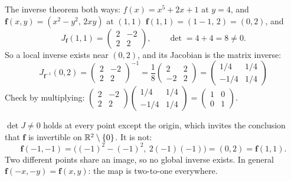 \begin{worked}{The inverse theorem both ways: $f(x)=x^{5}+2x+1$ at $y=4$, and $\mathbf{f}(x,y)=(x^{2}-y^{2},\,2xy)$ at $(1,1)$}
$\mathbf{f}(1,1)=(1-1,\,2)=(0,2)$, and
\[
  J_{\mathbf{f}}(1,1)=\begin{pmatrix}2&-2\\2&2\end{pmatrix},
  \qquad
  \det=4+4=8\neq0 .
\]
So a local inverse exists near $(0,2)$, and its Jacobian is the matrix
inverse:
\[
  J_{\mathbf{f}^{-1}}(0,2)
  =\begin{pmatrix}2&-2\\2&2\end{pmatrix}^{-1}
  =\frac18\begin{pmatrix}2&2\\-2&2\end{pmatrix}
  =\boxed{\begin{pmatrix}1/4&1/4\\-1/4&1/4\end{pmatrix}}
\]
Check by multiplying: $\begin{pmatrix}2&-2\\2&2\end{pmatrix}
\begin{pmatrix}1/4&1/4\\-1/4&1/4\end{pmatrix}
=\begin{pmatrix}1&0\\0&1\end{pmatrix}$. \checkmark
{}

$\det J\neq0$ holds at every point except the origin, which invites the
conclusion that $\mathbf{f}$ is invertible on $\mathbb{R}^{2}\setminus\{0\}$. It is
not:
\[
  \mathbf{f}(-1,-1)=\bigl((-1)^{2}-(-1)^{2},\ 2(-1)(-1)\bigr)=(0,2)
  =\mathbf{f}(1,1).
\]
Two different points share an image, so no global inverse exists. In general
$\mathbf{f}(-x,-y)=\mathbf{f}(x,y)$: the map is two-to-one everywhere.


\end{worked}
